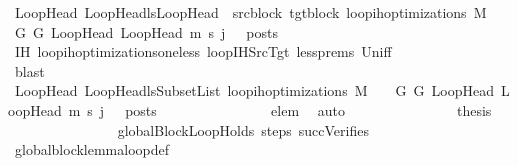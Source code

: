 \begin{isabellebody}
\ {\isachardoublequoteopen}{\isasymforall}{\isacharparenleft}{\kern0pt}LoopHead{\isacharcomma}{\kern0pt}\ LoopHead{\isacharprime}{\kern0pt}{\isacharparenright}{\kern0pt}{\isasymin}lsLoopHead\ {\isasymunion}\ {\isacharbraceleft}{\kern0pt}{\isacharparenleft}{\kern0pt}src{\isacharunderscore}{\kern0pt}block{\isacharcomma}{\kern0pt}\ tgt{\isacharunderscore}{\kern0pt}block{\isacharparenright}{\kern0pt}{\isacharbraceright}{\kern0pt}{\isachardot}{\kern0pt}\ loop{\isacharunderscore}{\kern0pt}ih{\isacharunderscore}{\kern0pt}optimizations\ M\ {\isasymLambda}\ {\isasymGamma}\ {\isasymOmega}\ G\ G{\isacharprime}{\kern0pt}\ LoopHead\ LoopHead{\isacharprime}{\kern0pt}\ m{\isacharprime}{\kern0pt}\ s{\isacharprime}{\kern0pt}\ {\isacharparenleft}{\kern0pt}j\ {\isacharminus}{\kern0pt}\ {}{\isacharparenright}{\kern0pt}\ posts{\isachardoublequoteclose}\isanewline
\ \ \ \ \ \ \ \ \ \ \ \ \ \ \isamarkupfalse%
\ IH\ loop{\isacharunderscore}{\kern0pt}ih{\isacharunderscore}{\kern0pt}optimizations{\isacharunderscore}{\kern0pt}one{\isacharunderscore}{\kern0pt}less\ loopIHSrcTgt\ less{\isachardot}{\kern0pt}prems{\isacharparenleft}{\kern0pt}{}{\isacharparenright}{\kern0pt}\ Un{\isacharunderscore}{\kern0pt}iff\ \isanewline
\ \ \ \ \ \ \ \ \ \ \ \ \ \ \isamarkupfalse%
\ blast\isanewline
\ \ \ \ \ \ \ \ \ \ \ \ \isamarkupfalse%
\ {\isachardoublequoteopen}{\isasymforall}{\isacharparenleft}{\kern0pt}LoopHead{\isacharcomma}{\kern0pt}\ LoopHead{\isacharprime}{\kern0pt}{\isacharparenright}{\kern0pt}{\isasymin}lsSubsetList{\isachardot}{\kern0pt}\ loop{\isacharunderscore}{\kern0pt}ih{\isacharunderscore}{\kern0pt}optimizations\ M\ {\isasymLambda}\ {\isasymGamma}\ {\isasymOmega}\ G\ G{\isacharprime}{\kern0pt}\ LoopHead\ LoopHead{\isacharprime}{\kern0pt}\ m{\isacharprime}{\kern0pt}\ s{\isacharprime}{\kern0pt}\ {\isacharparenleft}{\kern0pt}j\ {\isacharminus}{\kern0pt}\ {}{\isacharparenright}{\kern0pt}\ posts{\isachardoublequoteclose}\isanewline
\ \ \ \ \ \ \ \ \ \ \ \ \ \ \isamarkupfalse%
\ elem\ \isamarkupfalse%
\ auto\isanewline
\ \ \ \ \ \ \ \ \ \ \ \ \isamarkupfalse%
\ \isamarkupfalse%
\ {\isacharquery}{\kern0pt}thesis\isanewline
\ \ \ \ \ \ \ \ \ \ \ \ \ \ \isamarkupfalse%
\ globalBlockLoopHolds\ steps\ succVerifies\isanewline
\ \ \ \ \ \ \ \ \ \ \ \ \ \ \isamarkupfalse%
\ global{\isacharunderscore}{\kern0pt}block{\isacharunderscore}{\kern0pt}lemma{\isacharunderscore}{\kern0pt}loop{\isacharunderscore}{\kern0pt}def\isanewline

\end{isabellebody}
